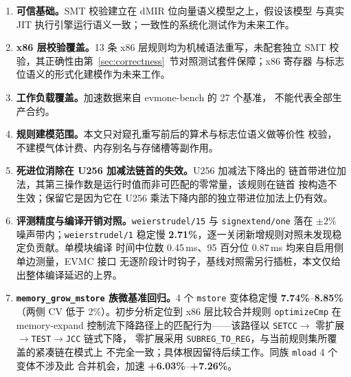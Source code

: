 \begin{enumerate}[leftmargin=1.8em]
  \item \textbf{可信基础。}SMT 校验建立在 dMIR 位向量语义模型之上，假设该模型
    与真实 JIT 执行引擎运行语义一致；一致性的系统化测试作为未来工作。
  \item \textbf{x86 层校验覆盖。}13 条 x86 层规则均为机械语法重写，未配套独立
    SMT 校验，其正确性由第~\ref{sec:correctness}~节对照测试套件保障；x86 寄存器
    与标志位语义的形式化建模作为未来工作。
  \item \textbf{工作负载覆盖。}加速数据来自 evmone-bench 的 27 个基准，
    不能代表全部生产合约。
  \item \textbf{规则建模范围。}本文只对窥孔重写前后的算术与标志位语义做等价性
    校验，不建模气体计费、内存别名与存储槽等副作用。
  \item \textbf{死进位消除在 U256 加减法链首的失效。}U256 加减法下降出的
    链首带进位加法，其第三操作数是运行时值而非可匹配的零常量，该规则在链首
    按构造不生效；保留它是因为它在 U256 乘法下降内部的独立带进位加法上仍有效。
  \item \textbf{评测精度与编译开销对照。}\texttt{weierstrudel/15} 与
    \texttt{signextend/one} 落在 $\pm 2\%$ 噪声带内；\texttt{weierstrudel/1}
    稳定慢 \textbf{2.71\%}，逐一关闭新增规则对照未发现稳定负贡献。单模块编译
    时间中位数 0.45\,ms、95 百分位 0.87\,ms 均来自启用侧单边测量，EVMC 接口
    无逐阶段计时钩子，基线对照需另行插桩，本文仅给出整体编译延迟的上界。
  \item \textbf{\texttt{memory\_grow\_mstore} 族微基准回归。}4 个
    \texttt{mstore} 变体稳定慢 \textbf{7.74\%}--\textbf{8.85\%}（两侧 CV 低于
    2\%）。初步分析定位到 x86 层比较合并规则 \texttt{optimizeCmp} 在
    memory-expand 控制流下降路径上的匹配行为——该路径以
    \texttt{SETCC}$\to$ 零扩展$\to$\texttt{TEST}$\to$\texttt{JCC} 链式下降，
    零扩展采用 \texttt{SUBREG\_TO\_REG}，与当前规则集所覆盖的紧凑链在模式上
    不完全一致；具体根因留待后续工作。同族 \texttt{mload} 4 个变体不涉及此
    合并机会，加速 \textbf{+6.03\%}--\textbf{+7.26\%}。
\end{enumerate}

